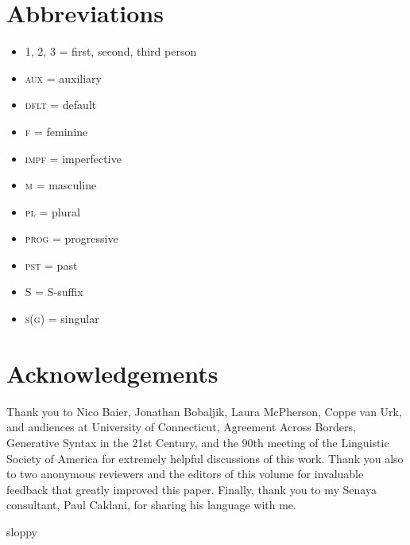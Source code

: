 \documentclass[output=paper
,modfonts
,nonflat]{langsci/langscibook}
\begin{document}
\section*{Abbreviations}

\begin{itemize}
\item 1, 2, 3 = first, second, third person
\item \textsc{aux} = auxiliary
\item \textsc{dflt} = default
\item \textsc{f} = feminine
\item \textsc{impf} = imperfective
\item \textsc{m} = masculine
\item \textsc{pl} = plural
\item \textsc{prog} = progressive
\item \textsc{pst} = past
\item S = S-suffix
\item \textsc{s(g)} = singular
\end{itemize}

\section*{Acknowledgements}

Thank you to Nico Baier, Jonathan Bobaljik, Laura McPherson, Coppe van Urk, and audiences at University of Connecticut, Agreement Across Borders, Generative Syntax in the 21st Century, and the 90th meeting of the Linguistic Society of America for extremely helpful discussions of this work. Thank you also to two anonymous reviewers and the editors of this volume for invaluable feedback that greatly improved this paper. Finally, thank you to my Senaya consultant, Paul Caldani, for sharing his language with me.

{sloppy
\printbibliography[heading=subbibliography,notkeyword=this]
}
\end{document}
